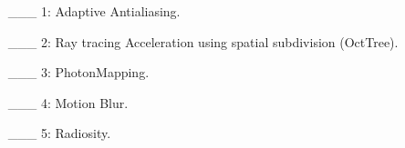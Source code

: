 \documentclass {article}
\begin{document}
 \begin{enumerate}
     \item[\_\_\_ 1:]  Adaptive Antialiasing.

     \item[\_\_\_ 2:]  Ray tracing Acceleration using spatial subdivision (OctTree).

     \item[\_\_\_ 3:]  PhotonMapping.

     \item[\_\_\_ 4:]  Motion Blur.
     
     \item[\_\_\_ 5:]  Radiosity.
\end{enumerate}

 
\end{document}
